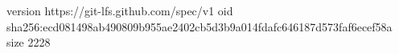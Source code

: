 version https://git-lfs.github.com/spec/v1
oid sha256:ecd081498ab490809b955ae2402cb5d3b9a014fdafc646187d573faf6ecef58a
size 2228
